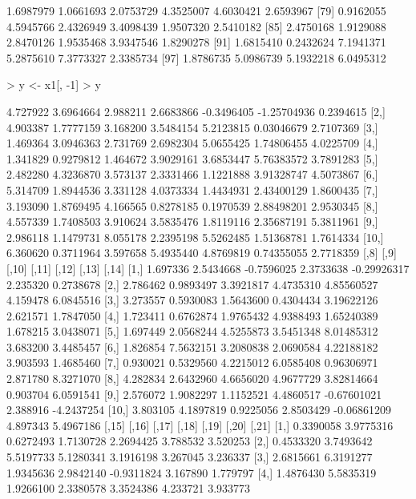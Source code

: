 \documentclass[12pt]{article}
\begin{document}
\begin{Schunk}
\begin{Soutput}
 [73]  1.6987979  1.0661693  2.0753729  4.3525007  4.6030421  2.6593967
 [79]  0.9162055  4.5945766  2.4326949  3.4098439  1.9507320  2.5410182
 [85]  2.4750168  1.9129088  2.8470126  1.9535468  3.9347546  1.8290278
 [91]  1.6815410  0.2432624  7.1941371  5.2875610  7.3773327  2.3385734
 [97]  1.8786735  5.0986739  5.1932218  6.0495312
\end{Soutput}
\begin{Sinput}
> y <- x1[, -1] 
> y
\end{Sinput}
\begin{Soutput}
          [,1]      [,2]     [,3]      [,4]       [,5]        [,6]      [,7]
 [1,] 4.727922 3.6964664 2.988211 2.6683866 -0.3496405 -1.25704936 0.2394615
 [2,] 4.903387 1.7777159 3.168200 3.5484154  5.2123815  0.03046679 2.7107369
 [3,] 1.469364 3.0946363 2.731769 2.6982304  5.0655425  1.74806455 4.0225709
 [4,] 1.341829 0.9279812 1.464672 3.9029161  3.6853447  5.76383572 3.7891283
 [5,] 2.482280 4.3236870 3.573137 2.3331466  1.1221888  3.91328747 4.5073867
 [6,] 5.314709 1.8944536 3.331128 4.0373334  1.4434931  2.43400129 1.8600435
 [7,] 3.193090 1.8769495 4.166565 0.8278185  0.1970539  2.88498201 2.9530345
 [8,] 4.557339 1.7408503 3.910624 3.5835476  1.8119116  2.35687191 5.3811961
 [9,] 2.986118 1.1479731 8.055178 2.2395198  5.5262485  1.51368781 1.7614334
[10,] 6.360620 0.3711964 3.597658 5.4935440  4.8769819  0.74355055 2.7718359
          [,8]      [,9]      [,10]     [,11]       [,12]    [,13]      [,14]
 [1,] 1.697336 2.5434668 -0.7596025 2.3733638 -0.29926317 2.235320  0.2738678
 [2,] 2.786462 0.9893497  3.3921817 4.4735310  4.85560527 4.159478  6.0845516
 [3,] 3.273557 0.5930083  1.5643600 0.4304434  3.19622126 2.621571  1.7847050
 [4,] 1.723411 0.6762874  1.9765432 4.9388493  1.65240389 1.678215  3.0438071
 [5,] 1.697449 2.0568244  4.5255873 3.5451348  8.01485312 3.683200  3.4485457
 [6,] 1.826854 7.5632151  3.2080838 2.0690584  4.22188182 3.903593  1.4685460
 [7,] 0.930021 0.5329560  4.2215012 6.0585408  0.96306971 2.871780  8.3271070
 [8,] 4.282834 2.6432960  4.6656020 4.9677729  3.82814664 0.903704  6.0591541
 [9,] 2.576072 1.9082297  1.1152521 4.4860517 -0.67601021 2.388916 -4.2437254
[10,] 3.803105 4.1897819  0.9225056 2.8503429 -0.06861209 4.897343  5.4967186
           [,15]      [,16]     [,17]      [,18]      [,19]    [,20]    [,21]
 [1,]  0.3390058  3.9775316 0.6272493  1.7130728  2.2694425 3.788532 3.520253
 [2,]  0.4533320  3.7493642 5.5197733  5.1280341  3.1916198 3.267045 3.236337
 [3,]  2.6815661  6.3191277 1.9345636  2.9842140 -0.9311824 3.167890 1.779797
 [4,]  1.4876430  5.5835319 1.9266100  2.3380578  3.3524386 4.233721 3.933773

\end{Soutput}
\end{Schunk}
\end{document}
